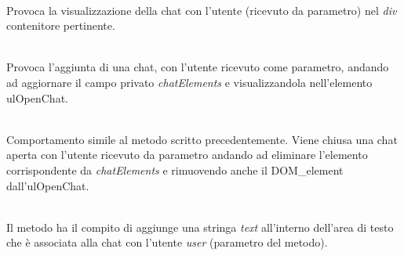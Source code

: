 \begin{description}
\item{}\\
Provoca la visualizzazione della chat con l'utente (ricevuto da parametro) nel \textit{div} contenitore pertinente.

\item{}\\
Provoca l'aggiunta di una chat, con l'utente ricevuto come parametro, andando ad aggiornare il campo privato \textit{chatElements} e visualizzandola nell'elemento ulOpenChat.
	
\item{}\\
Comportamento simile al metodo scritto precedentemente. Viene chiusa una chat aperta con l'utente ricevuto da parametro andando ad eliminare l'elemento corrispondente da \textit{chatElements} e rimuovendo anche il DOM\_element dall'ulOpenChat.

\item{}\\
Il metodo ha il compito di aggiunge una stringa \textit{text} all'interno dell'area di testo che è associata alla chat con l'utente \textit{user} (parametro del metodo).


\end{description}
